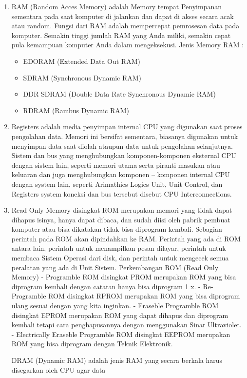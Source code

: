 \documentclass{article}
\begin{document}
\begin{enumerate}

\item RAM (Random Acces Memory) adalah Memory tempat Penyimpanan sementara pada saat komputer di jalankan dan dapat di akses secara acak atau random. Fungsi dari RAM adalah mempercepat pemrosesan data pada komputer. Semakin tinggi jumlah RAM yang Anda miliki, semakin cepat pula kemampuan komputer Anda dalam mengeksekusi.
Jenis Memory RAM :

\begin{itemize}

\item EDORAM (Extended Data Out RAM)  
\item SDRAM (Synchronous Dynamic RAM)  
\item DDR SDRAM (Double Data Rate Synchronous Dynamic RAM) 
\item RDRAM (Rambus Dynamic RAM)

\end{itemize}

\item Registers adalah media penyimpan internal CPU yang digunakan saat proses pengolahan data. Memori ini bersifat sementara, biasanya digunakan untuk menyimpan data saat diolah ataupun data untuk pengolahan selanjutnya. Sistem dan bus yang menghubungkan komponen-komponen eksternal CPU dengan sistem lain, seperti memori utama serta piranti masukan atau keluaran dan juga menghubungkan komponen – komponen internal CPU dengan system lain, seperti Arimathics Logics Unit, Unit Control, dan Registers system koneksi dan bus tersebut disebut CPU Interconnections. \cite{junior2016evolusi}

\item Read Only Memory disingkat ROM merupakan memori yang tidak dapat dihapus isinya, hanya dapat dibaca, dan sudah diisi oleh pabrik pembuat komputer atau bisa dikatakan tidak bisa diprogram kembali. Sebagian perintah pada ROM akan dipindahkan ke RAM. Perintah yang ada di ROM antara lain, perintah untuk menampilkan pesan dilayar, perintah untuk membaca Sistem Operasi dari disk, dan perintah untuk mengecek semua peralatan yang ada di Unit Sistem.
Perkembangan ROM (Read Only Memory)
-  Programble ROM disingkat PROM merupakan ROM yang bisa diprogram kembali dengan catatan hanya bisa diprogram 1 x.
- Re-Programble ROM disingkat RPROM merupakan ROM yang bisa diprogram ulang sesuai dengan yang kita inginkan.
- Eraseble Programble ROM disingkat EPROM merupakan ROM yang dapat dihapus dan diprogram kembali tetapi cara penghapusannya dengan menggunakan Sinar Ultraviolet.
- Electrically Eraseble Programble ROM disingkat EEPROM merupakan ROM yang bisa diprogram dengan Teknik Elektronik. \cite{junior2016evolusi}

DRAM (Dynamic RAM) adalah jenis RAM yang secara berkala harus disegarkan oleh CPU agar data






\end{enumerate}
\end{document}

